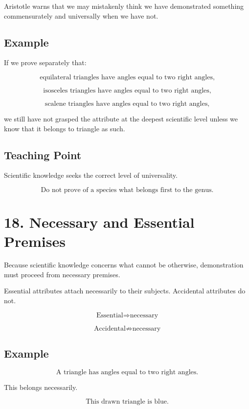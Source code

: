 \documentclass[12pt]{article}
\begin{document}
Aristotle warns that we may mistakenly think we have demonstrated something
commensurately and universally when we have not.

\subsection*{Example}

If we prove separately that:

\[
\text{equilateral triangles have angles equal to two right angles,}
\]

\[
\text{isosceles triangles have angles equal to two right angles,}
\]

\[
\text{scalene triangles have angles equal to two right angles,}
\]

we still have not grasped the attribute at the deepest scientific level unless
we know that it belongs to triangle as such.

\subsection*{Teaching Point}

Scientific knowledge seeks the correct level of universality.

\[
\boxed{
\text{Do not prove of a species what belongs first to the genus.}
}
\]

\section*{18. Necessary and Essential Premises}

Because scientific knowledge concerns what cannot be otherwise, demonstration
must proceed from necessary premises.

Essential attributes attach necessarily to their subjects. Accidental attributes
do not.

\[
\text{Essential} \Rightarrow \text{necessary}
\]

\[
\text{Accidental} \nRightarrow \text{necessary}
\]

\subsection*{Example}

\[
\text{A triangle has angles equal to two right angles.}
\]

This belongs necessarily.

\[
\text{This drawn triangle is blue.}
\]
\end{document}
